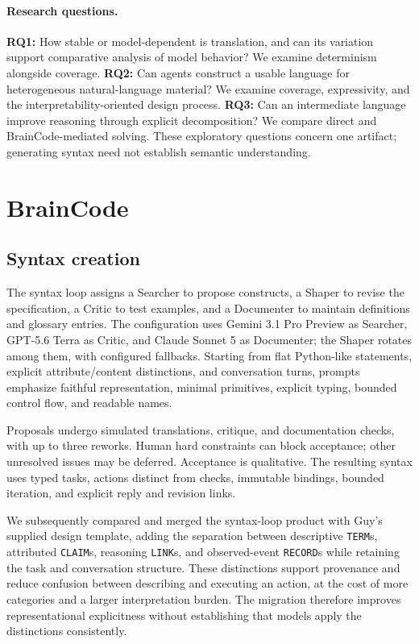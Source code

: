 \documentclass[11pt]{article}
\newcommand{\bc}{BrainCode}
\newcommand{\code}[1]{\texttt{#1}}
\begin{document}
\paragraph{Research questions.}
\textbf{RQ1:} How stable or model-dependent is translation, and can its variation support comparative analysis of model behavior? We examine determinism alongside coverage. \textbf{RQ2:} Can agents construct a usable language for heterogeneous natural-language material? We examine coverage, expressivity, and the interpretability-oriented design process. \textbf{RQ3:} Can an intermediate language improve reasoning through explicit decomposition? We compare direct and \bc{}-mediated solving. These exploratory questions concern one artifact; generating syntax need not establish semantic understanding.

\section{BrainCode}
\label{sec:braincode}
\subsection{Syntax creation}
The syntax loop assigns a Searcher to propose constructs, a Shaper to revise the specification, a Critic to test examples, and a Documenter to maintain definitions and glossary entries. The configuration uses Gemini 3.1 Pro Preview as Searcher, GPT-5.6 Terra as Critic, and Claude Sonnet 5 as Documenter; the Shaper rotates among them, with configured fallbacks. Starting from flat Python-like statements, explicit attribute/content distinctions, and conversation turns, prompts emphasize faithful representation, minimal primitives, explicit typing, bounded control flow, and readable names.

Proposals undergo simulated translations, critique, and documentation checks, with up to three reworks. Human hard constraints can block acceptance; other unresolved issues may be deferred. Acceptance is qualitative. The resulting syntax uses typed tasks, actions distinct from checks, immutable bindings, bounded iteration, and explicit reply and revision links.

We subsequently compared and merged the syntax-loop product with Guy's supplied design template, adding the separation between descriptive \code{TERM}s, attributed \code{CLAIM}s, reasoning \code{LINK}s, and observed-event \code{RECORD}s while retaining the task and conversation structure. These distinctions support provenance and reduce confusion between describing and executing an action, at the cost of more categories and a larger interpretation burden. The migration therefore improves representational explicitness without establishing that models apply the distinctions consistently.
\end{document}
